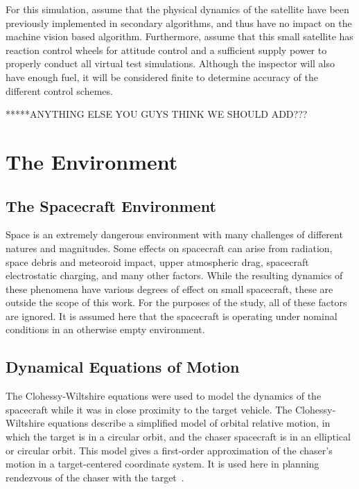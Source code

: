 \documentclass[journal, 10pt]{IEEEtran}
\begin{document}
For this simulation, assume that the physical dynamics of the satellite have been previously implemented in secondary algorithms, and thus have no impact on the machine vision based algorithm. Furthermore, assume that this small satellite has reaction control wheels for attitude control and a sufficient supply power to properly conduct all virtual test simulations.  Although the inspector will also have enough fuel, it will be considered finite to determine accuracy of the different control schemes.

*****ANYTHING ELSE YOU GUYS THINK WE SHOULD ADD???

\section{The Environment}
\subsection{The Spacecraft Environment}
Space is an extremely dangerous environment with many challenges of different natures and magnitudes. Some effects on spacecraft can arise from radiation, space debris and meteoroid impact, upper atmospheric drag, spacecraft electrostatic charging, and many other factors. While the resulting dynamics of these phenomena have various degrees of effect on small spacecraft, these are outside the scope of this work. For the purposes of the study, all of these factors are ignored. It is assumed here that the spacecraft is operating under nominal conditions in an otherwise empty environment.

\subsection{Dynamical Equations of Motion}
\label{cweqs}
The Clohessy-Wiltshire equations were used to model the dynamics of the spacecraft while it was in close proximity to the target vehicle. The Clohessy-Wiltshire equations describe a simplified model of orbital relative motion, in which the target is in a circular orbit, and the chaser spacecraft is in an elliptical or circular orbit. This model gives a first-order approximation of the chaser's motion in a target-centered coordinate system. It is used here in planning rendezvous of the chaser with the target~\cite{cw_eqs}.
\end{document}
